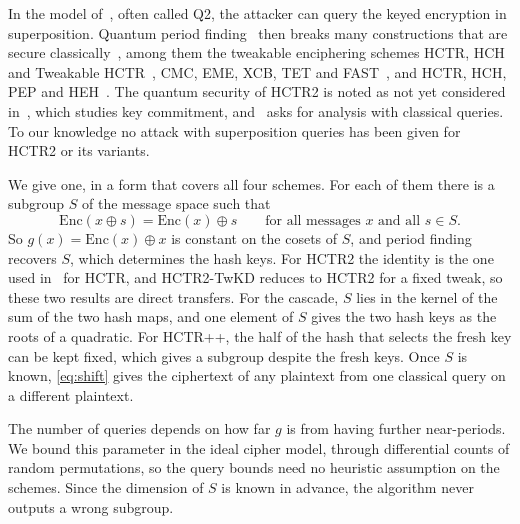\documentclass[11pt]{article}
\theoremstyle{definition}
\theoremstyle{remark}
\newcommand{\Enc}{\mathrm{Enc}}
\begin{document}
In the model of~\cite{KLLN16}, often called Q2, the attacker can query the keyed encryption in superposition. Quantum period finding~\cite{Sim97} then breaks many constructions that are secure classically~\cite{KM10,KLLN16}, among them the tweakable enciphering schemes HCTR, HCH and Tweakable HCTR~\cite{RP20}, CMC, EME, XCB, TET and FAST~\cite{GS21}, and HCTR, HCH, PEP and HEH~\cite{MWH24}. The quantum security of HCTR2 is noted as not yet considered in~\cite{CHMMNSSS26}, which studies key commitment, and~\cite[Section 2.2.5]{NIST25} asks for analysis with classical queries. To our knowledge no attack with superposition queries has been given for HCTR2 or its variants.

We give one, in a form that covers all four schemes. For each of them there is a subgroup $S$ of the message space such that
\begin{equation}\label{eq:shift}
\Enc(x\oplus s)=\Enc(x)\oplus s\qquad\text{for all messages $x$ and all $s\in S$.}
\end{equation}
So $g(x)=\Enc(x)\oplus x$ is constant on the cosets of $S$, and period finding recovers $S$, which determines the hash keys. For HCTR2 the identity is the one used in~\cite{RP20} for HCTR, and HCTR2-TwKD reduces to HCTR2 for a fixed tweak, so these two results are direct transfers. For the cascade, $S$ lies in the kernel of the sum of the two hash maps, and one element of $S$ gives the two hash keys as the roots of a quadratic. For HCTR++, the half of the hash that selects the fresh key can be kept fixed, which gives a subgroup despite the fresh keys. Once $S$ is known, \eqref{eq:shift} gives the ciphertext of any plaintext from one classical query on a different plaintext.

The number of queries depends on how far $g$ is from having further near-periods. We bound this parameter in the ideal cipher model, through differential counts of random permutations, so the query bounds need no heuristic assumption on the schemes. Since the dimension of $S$ is known in advance, the algorithm never outputs a wrong subgroup.
\end{document}

